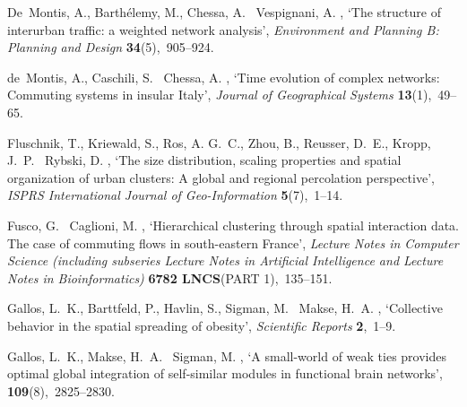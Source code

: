 \documentclass[11pt, a4paper]{article}
\begin{document}
\begin{thebibliography}{xx}
De~Montis, A., Barth{\'e}lemy, M., Chessa, A. \harvardand\ Vespignani, A.
  \harvardyearleft 2007\harvardyearright , `The structure of interurban
  traffic: a weighted network analysis', {\em Environment and Planning B:
  Planning and Design} {\bf 34}(5),~905--924.

de~Montis, A., Caschili, S. \harvardand\ Chessa, A.  \harvardyearleft
  2011\harvardyearright , `{Time evolution of complex networks: Commuting
  systems in insular Italy}', {\em Journal of Geographical Systems} {\bf
  13}(1),~49--65.

Fluschnik, T., Kriewald, S., Ros, A. G.~C., Zhou, B., Reusser, D.~E., Kropp,
  J.~P. \harvardand\ Rybski, D.  \harvardyearright , `{The
  size distribution, scaling properties and spatial organization of urban
  clusters: A global and regional percolation perspective}', {\em ISPRS
  International Journal of Geo-Information} {\bf 5}(7),~1--14.

Fusco, G. \harvardand\ Caglioni, M.  \harvardyearright ,
  `{Hierarchical clustering through spatial interaction data. The case of
  commuting flows in south-eastern France}', {\em Lecture Notes in Computer
  Science (including subseries Lecture Notes in Artificial Intelligence and
  Lecture Notes in Bioinformatics)} {\bf 6782 LNCS}(PART 1),~135--151.

Gallos, L.~K., Barttfeld, P., Havlin, S., Sigman, M. \harvardand\ Makse, H.~A.
  \harvardyearleft 2012\harvardyearright , `{Collective behavior in the spatial
  spreading of obesity}', {\em Scientific Reports} {\bf 2},~1--9.

Gallos, L.~K., Makse, H.~A. \harvardand\ Sigman, M.  \harvardyearright , `{A small-world of weak ties provides optimal global
  integration of self-similar modules in functional brain networks}',  {\bf
  109}(8),~2825--2830.
\newline{}


\end{thebibliography}
\end{document}
